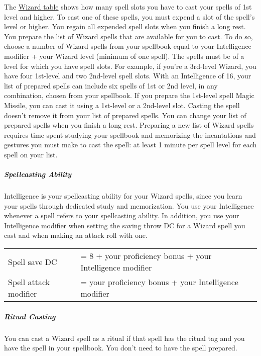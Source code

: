 The \hyperref[wizard-table]{Wizard table} shows how many spell slots you
have to cast your spells of 1st level and higher. To cast one of these
spells, you must expend a slot of the spell's level or higher. You
regain all expended spell slots when you finish a long rest. You prepare
the list of Wizard spells that are available for you to cast. To do so,
choose a number of Wizard spells from your spellbook equal to your
Intelligence modifier + your Wizard level (minimum of one spell). The
spells must be of a level for which you have spell slots. For example,
if you're a 3rd-level Wizard, you have four 1st-level and two 2nd-level
spell slots. With an Intelligence of 16, your list of prepared spells
can include six spells of 1st or 2nd level, in any combination, chosen
from your spellbook. If you prepare the 1st-level spell Magic Missile,
you can cast it using a 1st-level or a 2nd-level slot. Casting the spell
doesn't remove it from your list of prepared spells. You can change your
list of prepared spells when you finish a long rest. Preparing a new
list of Wizard spells requires time spent studying your spellbook and
memorizing the incantations and gestures you must make to cast the
spell: at least 1 minute per spell level for each spell on your list.

\subparagraph{Spellcasting Ability}\label{_spellcasting_ability_3}

Intelligence is your spellcasting ability for your Wizard spells, since
you learn your spells through dedicated study and memorization. You use
your Intelligence whenever a spell refers to your spellcasting ability.
In addition, you use your Intelligence modifier when setting the saving
throw DC for a Wizard spell you cast and when making an attack roll with
one.

\begin{longtable}[]{@{}
  >{\raggedright\arraybackslash}p{}
  >{\raggedright\arraybackslash}p{}@{}}
\toprule\noalign{}
\endhead
\bottomrule\noalign{}
\endlastfoot
Spell save DC & = 8 + your proficiency bonus + your Intelligence
modifier \\
Spell attack modifier & = your proficiency bonus + your Intelligence
modifier \\
\end{longtable}

\subparagraph{Ritual Casting}\label{_ritual_casting_2}

You can cast a Wizard spell as a ritual if that spell has the ritual tag
and you have the spell in your spellbook. You don't need to have the
spell prepared.

